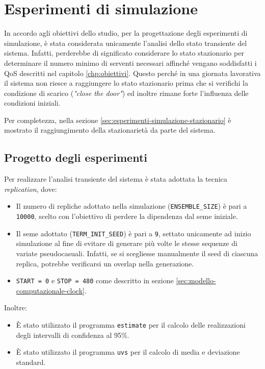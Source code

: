 \chapter{Esperimenti di simulazione}\label{chp:esperimenti-simulazione}
In accordo agli obiettivi dello studio, per la progettazione degli esperimenti di simulazione, è stata considerata unicamente l'analisi dello stato transiente del sistema. Infatti, perderebbe di significato considerare lo stato stazionario per determinare il numero minimo di serventi necessari affinché vengano soddisfatti i QoS descritti nel capitolo \ref{chp:obiettivi}. Questo perché in una giornata lavorativa il sistema non riesce a raggiungere lo stato stazionario prima che si verifichi la condizione di scarico (\textit{"close the door"}) ed inoltre rimane forte l'influenza delle condizioni iniziali. 

Per completezza, nella sezione \ref{sec:esperimenti-simulazione-stazionario} è mostrato il raggiungimento della stazionarietà da parte del sistema. 

\section{Progetto degli esperimenti}\label{sec:esperimenti-simulazione-1}
Per realizzare l'analisi transiente del sistema è stata adottata la tecnica \textit{replication}, dove:
\begin{itemize}
\item Il numero di repliche adottato nella simulazione (\texttt{ENSEMBLE\_SIZE}) è pari a \texttt{10000}, scelto con l'obiettivo di perdere la dipendenza dal seme iniziale.
\item Il seme adottato (\texttt{TERM\_INIT\_SEED}) è pari a \texttt{9}, settato unicamente ad inizio simulazione al fine di evitare di generare più volte le stesse sequenze di variate pseudocasuali. Infatti, se si scegliesse manualmente il seed di ciascuna replica, potrebbe verificarsi un overlap nella generazione.
\item \texttt{START = 0} e \texttt{STOP = 480} come descritto in sezione \ref{sec:modello-computazionale-clock}.
\end{itemize}

Inoltre:
\begin{itemize}
\item È stato utilizzato il programma \texttt{estimate} per il calcolo delle realizzazioni degli intervalli di confidenza al 95\%.
\item È stato utilizzato il programma \texttt{uvs} per il calcolo di media e deviazione standard.
\end{itemize}

